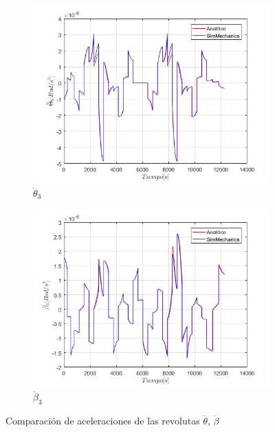 \begin{figure}
\begin{subfigure}{0.45\textwidth}
        \includegraphics[width=\linewidth]{Cap4_DisenoBasico/Figura/ComparativoSimMechanics/ThetaPPunto3.jpg}
        \caption{$\ddot{\theta}_3$}
    \end{subfigure}
    \begin{subfigure}{0.45\textwidth}
        \includegraphics[width=\linewidth]{Cap4_DisenoBasico/Figura/ComparativoSimMechanics/BetaPPunto3.jpg}
        \caption{$\ddot{\beta}_3$}
    \end{subfigure}
    \caption{Comparación de aceleraciones de las revolutas $\ddot{\theta}$, $\ddot{\beta}$}
\end{figure}

